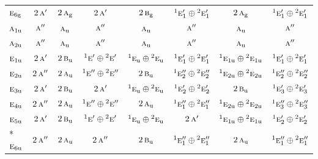\documentclass[10pt,a4paper]{article}
\numberwithin{equation}{section}
\newcommand{\irr}[1]{\text{\normalfont\scshape #1}}
\newcommand{\conjpair}[1]{{}^{#1}}
\newcommand{\ptag}[1]{\mathrm{#1}}
\begin{document}
{\begin{longtable}{@{}lccccccc@{}}
$\irr{e}_{6\ptag{g}}$ & $2\,\irr{a}'$ & $2\,\irr{a}_{\ptag{g}}$ & $2\,\irr{a}'$ & $2\,\irr{b}_{\ptag{g}}$ & $\conjpair{1}\irr{e}_{1}'\oplus \conjpair{2}\irr{e}_{1}'$ & $2\,\irr{a}_{\ptag{g}}$ & $\conjpair{1}\irr{e}_{1}'\oplus \conjpair{2}\irr{e}_{1}'$\\
$\irr{a}_{1\ptag{u}}$ & $\irr{a}''$ & $\irr{a}_{\ptag{u}}$ & $\irr{a}''$ & $\irr{a}_{\ptag{u}}$ & $\irr{a}''$ & $\irr{a}_{\ptag{u}}$ & $\irr{a}''$\\
$\irr{a}_{2\ptag{u}}$ & $\irr{a}''$ & $\irr{a}_{\ptag{u}}$ & $\irr{a}''$ & $\irr{a}_{\ptag{u}}$ & $\irr{a}''$ & $\irr{a}_{\ptag{u}}$ & $\irr{a}''$\\
$\irr{e}_{1\ptag{u}}$ & $2\,\irr{a}'$ & $2\,\irr{b}_{\ptag{u}}$ & $\conjpair{1}\irr{e}'\oplus \conjpair{2}\irr{e}'$ & $\conjpair{1}\irr{e}_{\ptag{u}}\oplus \conjpair{2}\irr{e}_{\ptag{u}}$ & $\conjpair{1}\irr{e}_{1}'\oplus \conjpair{2}\irr{e}_{1}'$ & $\conjpair{1}\irr{e}_{1\ptag{u}}\oplus \conjpair{2}\irr{e}_{1\ptag{u}}$ & $\conjpair{1}\irr{e}_{1}'\oplus \conjpair{2}\irr{e}_{1}'$\\
$\irr{e}_{2\ptag{u}}$ & $2\,\irr{a}''$ & $2\,\irr{a}_{\ptag{u}}$ & $\conjpair{1}\irr{e}''\oplus \conjpair{2}\irr{e}''$ & $2\,\irr{b}_{\ptag{u}}$ & $\conjpair{1}\irr{e}_{2}''\oplus \conjpair{2}\irr{e}_{2}''$ & $\conjpair{1}\irr{e}_{2\ptag{u}}\oplus \conjpair{2}\irr{e}_{2\ptag{u}}$ & $\conjpair{1}\irr{e}_{2}''\oplus \conjpair{2}\irr{e}_{2}''$\\
$\irr{e}_{3\ptag{u}}$ & $2\,\irr{a}'$ & $2\,\irr{b}_{\ptag{u}}$ & $2\,\irr{a}'$ & $\conjpair{1}\irr{e}_{\ptag{u}}\oplus \conjpair{2}\irr{e}_{\ptag{u}}$ & $\conjpair{1}\irr{e}_{2}'\oplus \conjpair{2}\irr{e}_{2}'$ & $2\,\irr{b}_{\ptag{u}}$ & $\conjpair{1}\irr{e}_{3}'\oplus \conjpair{2}\irr{e}_{3}'$\\
$\irr{e}_{4\ptag{u}}$ & $2\,\irr{a}''$ & $2\,\irr{a}_{\ptag{u}}$ & $\conjpair{1}\irr{e}''\oplus \conjpair{2}\irr{e}''$ & $2\,\irr{a}_{\ptag{u}}$ & $\conjpair{1}\irr{e}_{1}''\oplus \conjpair{2}\irr{e}_{1}''$ & $\conjpair{1}\irr{e}_{2\ptag{u}}\oplus \conjpair{2}\irr{e}_{2\ptag{u}}$ & $\conjpair{1}\irr{e}_{3}''\oplus \conjpair{2}\irr{e}_{3}''$\\
$\irr{e}_{5\ptag{u}}$ & $2\,\irr{a}'$ & $2\,\irr{b}_{\ptag{u}}$ & $\conjpair{1}\irr{e}'\oplus \conjpair{2}\irr{e}'$ & $\conjpair{1}\irr{e}_{\ptag{u}}\oplus \conjpair{2}\irr{e}_{\ptag{u}}$ & $2\,\irr{a}'$ & $\conjpair{1}\irr{e}_{1\ptag{u}}\oplus \conjpair{2}\irr{e}_{1\ptag{u}}$ & $\conjpair{1}\irr{e}_{2}'\oplus \conjpair{2}\irr{e}_{2}'$\\*
$\irr{e}_{6\ptag{u}}$ & $2\,\irr{a}''$ & $2\,\irr{a}_{\ptag{u}}$ & $2\,\irr{a}''$ & $2\,\irr{b}_{\ptag{u}}$ & $\conjpair{1}\irr{e}_{1}''\oplus \conjpair{2}\irr{e}_{1}''$ & $2\,\irr{a}_{\ptag{u}}$ & $\conjpair{1}\irr{e}_{1}''\oplus \conjpair{2}\irr{e}_{1}''$\\
\bottomrule\end{longtable}}
\end{document}
